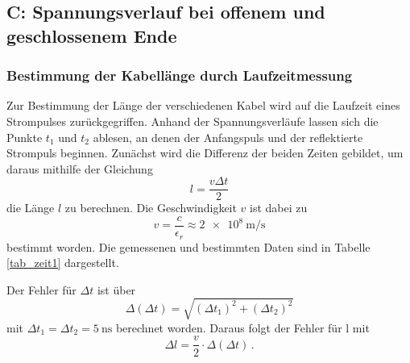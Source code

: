 \FloatBarrier
\subsection{C: Spannungsverlauf bei offenem und geschlossenem Ende} %
\label{sub:c_laengenmessung}

\subsubsection{Bestimmung der Kabellänge durch Laufzeitmessung} %
\label{sub:bestimmung_der_kabellaenge_durch_laufzeitmessung}

Zur Bestimmung der Länge der verschiedenen Kabel wird auf die Laufzeit eines Strompulses zurückgegriffen.
Anhand der Spannungsverläufe lassen sich die Punkte $t_1$ und $t_2$ ablesen, an denen der Anfangspuls und der reflektierte Strompuls beginnen.
Zunächst wird die Differenz der beiden Zeiten gebildet, um daraus mithilfe der Gleichung
\begin{equation*}
	l = \frac{v \Delta t}{2}
\end{equation*}
die Länge $l$ zu berechnen.
Die Geschwindigkeit $v$ ist dabei zu
\begin{equation*}
	v = \frac{c}{\epsilon_r} \approx \SI{2e8}{\meter\per\second}
\end{equation*}
bestimmt worden.
Die gemessenen und bestimmten Daten sind in Tabelle \ref{tab_zeit1} dargestellt.

Der Fehler für $\Delta t$ ist über
\begin{equation*}
	\Delta (\Delta t) = \sqrt{\left(\Delta t_1 \right)^2 + \left(\Delta t_2 \right)^2}
\end{equation*}
mit $\Delta t_1 = \Delta t_2 = \SI{5}{\nano\second}$ berechnet worden. Daraus folgt der Fehler für l mit
\begin{equation*}
	\Delta l = \frac{v}{2} \cdot \Delta (\Delta t)\,.
\end{equation*}


